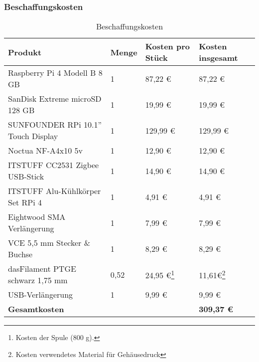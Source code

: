\subsubsection{Beschaffungskosten}\label{ku_kosten_beschaffung}
\begin{center}
\begin{table}[H]
    \begin{tabularx}{\textwidth}{|p{5.6cm}|p{1.2cm}|p{3.44cm}|p{3.5cm}|}
        \hline
 	    \textbf{Produkt} & \textbf{Menge} & \textbf{Kosten pro Stück}  & \textbf{Kosten insgesamt}\\
	    \hline
	    \hline
	    Raspberry Pi 4 Modell B 8 GB & 1 & 87,22 \euro{} & 87,22 \euro{} \\
	    \hline
	    SanDisk Extreme microSD 128 GB & 1 & 19,99 \euro{} & 19,99 \euro{} \\
	    \hline
	    SUNFOUNDER RPi 10.1'' Touch Display & 1 & 129,99 \euro{} & 129,99 \euro{} \\
	    \hline
	    Noctua NF-A4x10 5v & 1 & 12,90 \euro{} & 12,90 \euro{} \\
	    \hline
	    ITSTUFF CC2531 Zigbee USB-Stick & 1 & 14,90 \euro{} & 14,90 \euro{} \\
	    \hline
	    ITSTUFF Alu-Kühlkörper Set RPi 4 & 1 & 4,91 \euro{} & 4,91 \euro{} \\
	    \hline
	    Eightwood SMA Verlängerung & 1 & 7,99 \euro{} & 7,99 \euro{} \\ 
	    \hline
	    VCE 5,5 mm Stecker \& Buchse & 1 & 8,29 \euro{} & 8,29 \euro{} \\
	    \hline
	    dasFilament PTGE schwarz 1,75 mm & 0,52 & 24,95 \euro{}\footnote{Kosten der Spule (800 g).} & 11,61\euro{}\footnote{Kosten verwendetes Material für Gehäusedruck} \\
	    \hline
	    USB-Verlängerung & 1 & 9,99 \euro{} & 9,99 \euro{}\\
	    \hline
	    \hline
	    \textbf{Gesamtkosten} &  &  & \textbf{309,37 \euro{}} \\ %
	    \hline
    \end{tabularx}
    \caption{Beschaffungskosten}
    \label{tab:ku_kostenberechnung}
\end{table}
\end{center}